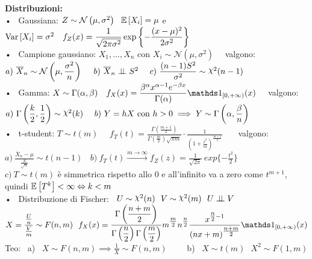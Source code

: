 \newpage





\textbf{Distribuzioni:}\\

• \ Gaussiana: $ Z\sim\Nc \O \mu,\sigma^2 \C \ \  \E{
X_i}=\mu$ e $\var{X_i}=\sigma^2 \ \ \ f_Z(x)=\frac{1}{\sqrt{2\pi \sigma^2}}\exp\left\{-\frac{(x-\mu )^2}{2\sigma^2}\right\}$ \\


• \ Campione gaussiano: $X_1, ..., X_n$ con $X_i \sim \mathcal{N}(\mu,\sigma^2)$ \ \  valgono:\\
$ a) \ \overline{X}_n\sim\mathcal{N} \O \mu, \frac{\sigma^2}{n} \C \ \ \ \ b) \ \overline{X}_n\ind S^2 \ \ \ \ c) \ \frac{(n-1)S^2}{\sigma^2}\sim\Chi^2(n-1)$\\

• \ Gamma: $X\sim\Gamma(\alpha,\beta) \ \ \ f_X(x)=\frac{\beta^{\alpha} x^{\alpha -1} e^{-\beta x}}{\Gamma (\alpha )}\II_{[0,+\infty )} (x)$  \ \ valgono:\\
%
$a) \ \Gamma \O \frac{k}{2},\frac{1}{2} \C \sim \Chi^2(k) \ \ \ \ b) \ Y=hX \text{ con } h>0 \implies Y\sim\Gamma\O\alpha,\frac{\beta}{n}\C$ \\

• \ t-student: $T\sim t(m)$ \ \ $f_T(t)=\frac{\Gamma \left(\frac{m+1}{2}\right)}{\Gamma \left(\frac{m}{2}\right)\sqrt{\pi m}} \cdot \frac{1}{\left( 1+\tfrac{t^2}{m}\right)^{\tfrac{m+1}{2}}}$ \ \ \ valgono:\\
$a) \ \frac{\overline{X}_n-\mu}{\tfrac{S}{\sqrt{n}}}\sim t(n-1) \ \ \ \ b) \ f_T(t)\xrightarrow{m \to \infty} f_Z(z)=\frac{1}{\sqrt{2\pi}} \ exp\{ -\frac{t^2}{2} \} $ \\
$c) \ T\sim t(m)$ è simmetrica rispetto allo 0 e all'infinito va a zero come $t^{m+1}$, quindi $\mathbb{E} \left[ T^k \right]<\infty \Leftrightarrow k<m$\\

• \ Distribuzione di Fischer: \ $U\sim\Chi^2(n) \ \ V\sim\Chi^2(m) \ \ U\ind V $\\
$X=\frac{\tfrac{U}{n}}{\tfrac{V}{m}}\sim F(n,m) \ \ f_X(x)=\frac{\Gamma \O \frac{n+m}{2} \C }{\Gamma \O \frac{n}{2} \C \Gamma \O \frac{m}{2} \C } m^{\tfrac{m}{2}}n^{\tfrac{n}{2}} \frac{x^{\tfrac{n}{2}-1}}{(nx+m)^{\tfrac{n+m}{2}}}\II_{[0,+\infty)}(x)$\\ 

Teo: \ a) \ $X\sim F(n,m) \implies \frac1X \sim F(n,m)$ \ \ \ \ b) \ $X\sim t(m) \ \ \ X^2\sim F(1,m)$\\ \\


